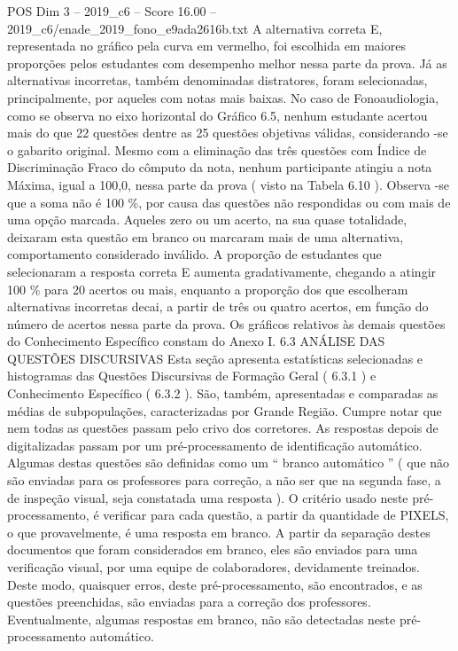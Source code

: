 \begin{textsample}{POS Dim 3 – 2019\_c6 – Score 16.00 – 2019\_c6/enade\_2019\_fono\_e9ada2616b.txt}
A alternativa correta E, representada no gráfico pela curva em vermelho, foi escolhida em maiores proporções pelos estudantes com desempenho melhor nessa parte da prova.
Já as alternativas incorretas, também denominadas distratores, foram selecionadas, principalmente, por aqueles com notas mais baixas.
No caso de Fonoaudiologia, como se observa no eixo horizontal do Gráfico 6.5, nenhum estudante acertou mais do que 22 questões dentre as 25 questões objetivas válidas, considerando -se o gabarito original.
Mesmo com a eliminação das três questões com Índice de Discriminação Fraco do cômputo da nota, nenhum participante atingiu a nota Máxima, igual a 100,0, nessa parte da prova ( visto na Tabela 6.10 ).
Observa -se que a soma não é 100 \%, por causa das questões não respondidas ou com mais de uma opção marcada.
Aqueles zero ou um acerto, na sua quase totalidade, deixaram esta questão em branco ou marcaram mais de uma alternativa, comportamento considerado inválido.
A proporção de estudantes que selecionaram a resposta correta E aumenta gradativamente, chegando a atingir 100 \% para 20 acertos ou mais, enquanto a proporção dos que escolheram alternativas incorretas decai, a partir de três ou quatro acertos, em função do número de acertos nessa parte da prova.
Os gráficos relativos às demais questões do Conhecimento Específico constam do Anexo I. 6.3 ANÁLISE DAS QUESTÕES DISCURSIVAS Esta seção apresenta estatísticas selecionadas e histogramas das Questões Discursivas de Formação Geral ( 6.3.1 ) e Conhecimento Específico ( 6.3.2 ).
São, também, apresentadas e comparadas as médias de subpopulações, caracterizadas por Grande Região.
Cumpre notar que nem todas as questões passam pelo crivo dos corretores.
As respostas depois de digitalizadas passam por um pré-processamento de identificação automático.
Algumas destas questões são definidas como um “ branco automático ” ( que não são enviadas para os professores para correção, a não ser que na segunda fase, a de inspeção visual, seja constatada uma resposta ).
O critério usado neste pré-processamento, é verificar para cada questão, a partir da quantidade de PIXELS, o que provavelmente, é uma resposta em branco.
A partir da separação destes documentos que foram considerados em branco, eles são enviados para uma verificação visual, por uma equipe de colaboradores, devidamente treinados.
Deste modo, quaisquer erros, deste pré-processamento, são encontrados, e as questões preenchidas, são enviadas para a correção dos professores.
Eventualmente, algumas respostas em branco, não são detectadas neste pré-processamento automático.

\end{textsample}
